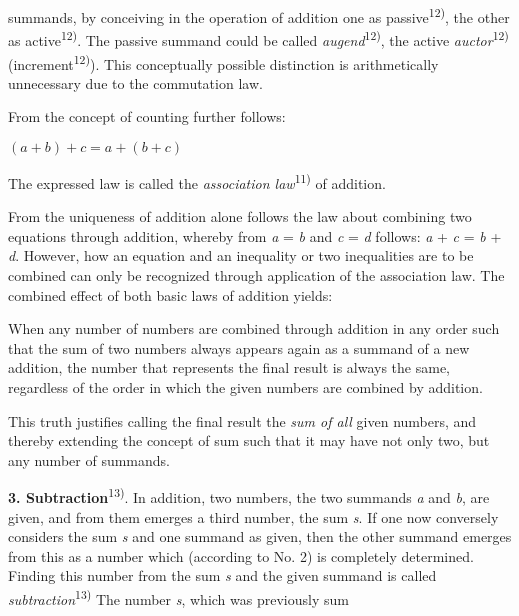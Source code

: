 \thispagestyle{fancy}

\vspace{0.5cm}

summands, by conceiving in the operation of addition one as passive\textsuperscript{12)}, the other as active\textsuperscript{12)}. The passive summand could be called \textit{augend}\textsuperscript{12)}, the active \textit{auctor}\textsuperscript{12)} (increment\textsuperscript{12)}). This conceptually possible distinction is arithmetically unnecessary due to the commutation law.

From the concept of counting further follows:

\begin{center}
$(a + b) + c = a + (b + c)$
\end{center}

The expressed law is called the \textit{association law}\textsuperscript{11)} of addition.

From the uniqueness of addition alone follows the law about combining two equations through addition, whereby from \textit{a} = \textit{b} and \textit{c} = \textit{d} follows: \textit{a} + \textit{c} = \textit{b} + \textit{d}. However, how an equation and an inequality or two inequalities are to be combined can only be recognized through application of the association law. The combined effect of both basic laws of addition yields:

When any number of numbers are combined through addition in any order such that the sum of two numbers always appears again as a summand of a new addition, the number that represents the final result is always the same, regardless of the order in which the given numbers are combined by addition.

This truth justifies calling the final result the \textit{sum of all} given numbers, and thereby extending the concept of sum such that it may have not only two, but any number of summands.

\textbf{3. Subtraction}\textsuperscript{13)}. In addition, two numbers, the two summands \textit{a} and \textit{b}, are given, and from them emerges a third number, the sum \textit{s}. If one now conversely considers the sum \textit{s} and one summand as given, then the other summand emerges from this as a number which (according to No. 2) is completely determined. Finding this number from the sum \textit{s} and the given summand is called \hfill \textit{subtraction}\textsuperscript{13)} \hfill The \hfill number \hfill \textit{s}, \hfill which \hfill was \hfill previously \hfill sum

